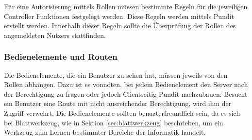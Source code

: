 

Für eine Autorisierung mittels Rollen müssen bestimmte Regeln für die jeweiligen Controller Funktionen festgelegt werden. Diese Regeln werden mittels Pundit erstellt werden. Innerhalb dieser Regeln sollte die Überprüfung der Rollen des angemeldeten Nutzers stattfinden.


\subsubsection{Bedienelemente und Routen}
Die Bedienelemente, die ein Benutzer zu sehen hat, müssen jeweils von den Rollen abhängen. Dazu ist es vonnöten, bei jedem Bedienelement den Server nach der Berechtigung zu fragen oder jedoch Clientseitig Pundit nachzubauen. Besucht ein Benutzer eine Route mit nicht ausreichender Berechtigung, wird ihm der Zugriff verwehrt. Die Bedienelemente sollten benuzterfreundlich sein, da es sich bei Blattwerkzeug, wie in Sektion \ref{sec:blattwerkzeug} beschrieben, um ein Werkzeug zum Lernen bestimmter Bereiche der Informatik handelt.

